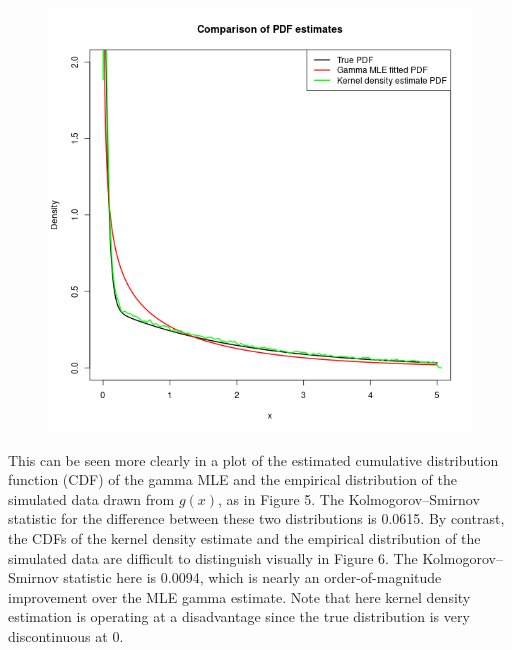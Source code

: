 \documentclass[english]{paper}
\begin{document}
\begin{figure}
\caption{}

\includegraphics[scale=0.75]{images/Comparison-of-PDF-estimates}
\end{figure}

This can be seen more clearly in a plot of the estimated cumulative
distribution function (CDF) of the gamma MLE and the empirical distribution
of the simulated data drawn from $g(x)$, as in Figure 5. The Kolmogorov--Smirnov
statistic for the difference between these two distributions is 0.0615.
By contrast, the CDFs of the kernel density estimate and the empirical
distribution of the simulated data are difficult to distinguish visually
in Figure 6. The Kolmogorov--Smirnov statistic here is 0.0094, which
is nearly an order-of-magnitude improvement over the MLE gamma estimate.
Note that here kernel density estimation is operating at a disadvantage
since the true distribution is very discontinuous at 0.
\end{document}
